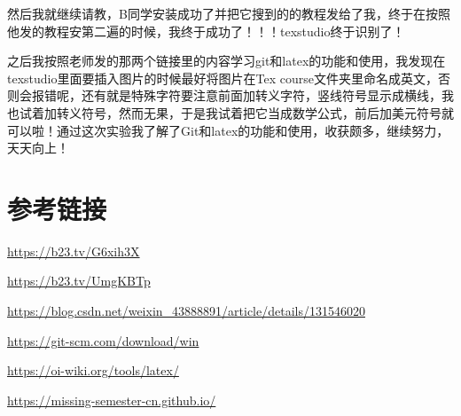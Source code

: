 \documentclass[a4paper ,12pt]{article}
\begin{document}
  然后我就继续请教，B同学安装成功了并把它搜到的的教程发给了我，终于在按照他发的教程安第二遍的时候，我终于成功了！！！texstudio终于识别了！
  
  之后我按照老师发的那两个链接里的内容学习git和latex的功能和使用，我发现在texstudio里面要插入图片的时候最好将图片在Tex course文件夹里命名成英文，否则会报错呢，还有就是特殊字符要注意前面加转义字符，竖线符号显示成横线，我也试着加转义符号，然而无果，于是我试着把它当成数学公式，前后加美元符号就可以啦！通过这次实验我了解了Git和latex的功能和使用，收获颇多，继续努力，天天向上！
  \section{参考链接}
  \href{https://b23.tv/G6xih3X}{https://b23.tv/G6xih3X}
  
  \href{https://b23.tv/UmgkBTp}{https://b23.tv/UmgKBTp}
  
  \href{https://blog.csdn.net/weixin_43888891/article/details/131546020}{https://blog.csdn.net/weixin\_43888891/article/details/131546020}
  
  \href{https://git-scm.com/download/win}{https://git-scm.com/download/win}
  
  \href{https://oi-wiki.org/tools/latex/}{https://oi-wiki.org/tools/latex/}
  
  \href{https://missing-semester-cn.github.io/}{https://missing-semester-cn.github.io/}
\end{document}
